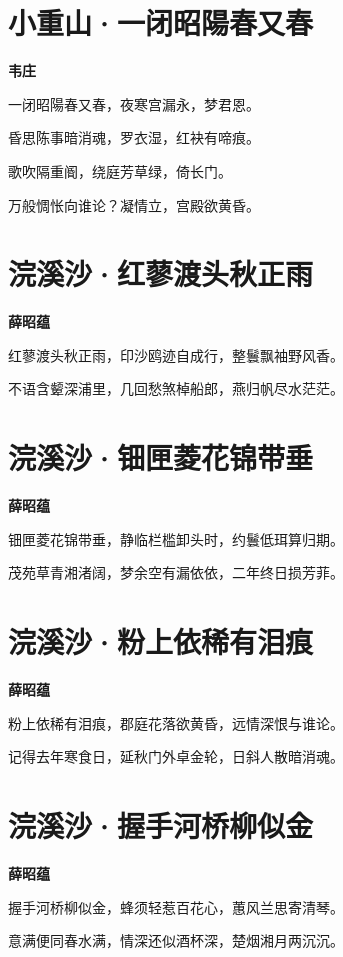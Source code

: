 \documentclass[12pt,a4paper]{ctexbook}
\begin{document}
\section{小重山·一闭昭陽春又春}
\textbf{韦庄}\par\vspace{0.5em}
一闭昭陽春又春，夜寒宫漏永，梦君恩。\par
昏思陈事暗消魂，罗衣湿，红袂有啼痕。\par
歌吹隔重阍，绕庭芳草绿，倚长门。\par
万般惆怅向谁论？凝情立，宫殿欲黄昏。\par

\section{浣溪沙·红蓼渡头秋正雨}
\textbf{薛昭蕴}\par\vspace{0.5em}
红蓼渡头秋正雨，印沙鸥迹自成行，整鬟飘袖野风香。\par
不语含颦深浦里，几回愁煞棹船郎，燕归帆尽水茫茫。\par

\section{浣溪沙·钿匣菱花锦带垂}
\textbf{薛昭蕴}\par\vspace{0.5em}
钿匣菱花锦带垂，静临栏槛卸头时，约鬟低珥算归期。\par
茂苑草青湘渚阔，梦余空有漏依依，二年终日损芳菲。\par

\section{浣溪沙·粉上依稀有泪痕}
\textbf{薛昭蕴}\par\vspace{0.5em}
粉上依稀有泪痕，郡庭花落欲黄昏，远情深恨与谁论。\par
记得去年寒食日，延秋门外卓金轮，日斜人散暗消魂。\par

\section{浣溪沙·握手河桥柳似金}
\textbf{薛昭蕴}\par\vspace{0.5em}
握手河桥柳似金，蜂须轻惹百花心，蕙风兰思寄清琴。\par
意满便同春水满，情深还似酒杯深，楚烟湘月两沉沉。\par
\end{document}
